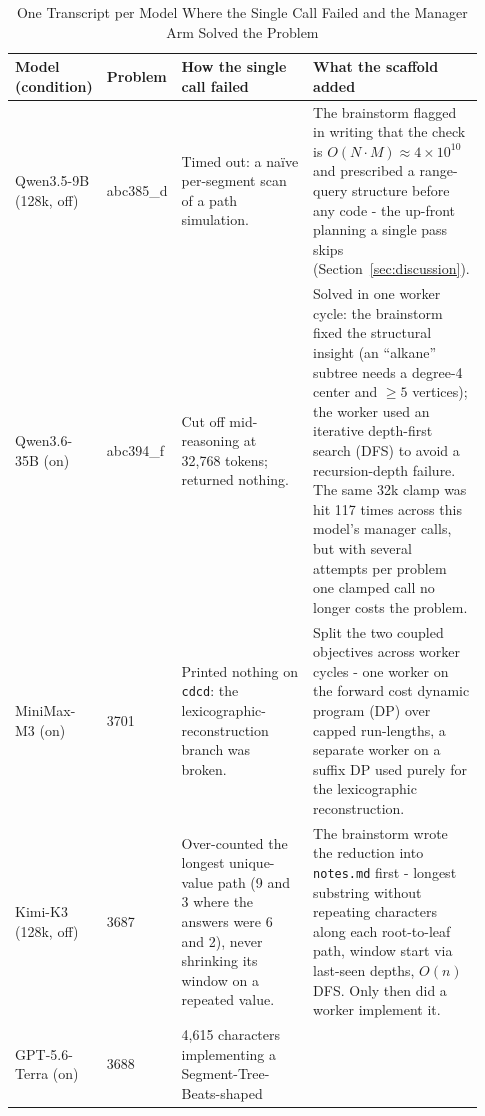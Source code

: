 \documentclass[journal]{IEEEtran}
\begin{document}
\begin{table}[!t]
\centering
\caption{One Transcript per Model Where the Single Call Failed and the Manager Arm Solved the Problem}
\label{tab:transcripts}
\footnotesize
\setlength{\tabcolsep}{4pt}
\setlength{\defaultaddspace}{2.5pt}
\begin{tabular}{@{}p{0.155\linewidth}p{0.101\linewidth}p{0.310\linewidth}p{0.364\linewidth}@{}}
\toprule
\textbf{Model} \newline \textbf{(condition)} & \textbf{Problem} & \textbf{How the single call failed} &
\textbf{What the scaffold added} \\
\midrule
Qwen3.5-9B \newline (128k, off) & abc385\_d & Timed out: a na\"ive per-segment scan of a path
simulation. & The brainstorm flagged in writing that the check is $O(N\cdot M) \approx
4\times10^{10}$ and prescribed a range-query structure before any code - the up-front
planning a single pass skips (Section~\ref{sec:discussion}). \\
\addlinespace
Qwen3.6-35B \newline (on) & abc394\_f & Cut off mid-reasoning at 32,768 tokens; returned nothing. &
Solved in one worker cycle: the brainstorm fixed the structural insight (an ``alkane'' subtree needs
a degree-4 center and $\ge 5$ vertices); the worker used an iterative depth-first search (DFS) to avoid a recursion-depth
failure. The same 32k clamp was hit 117 times across this model's manager calls, but with several
attempts per problem one clamped call no longer costs the problem. \\
\addlinespace
MiniMax-M3 \newline (on) & 3701 & Printed nothing on \texttt{cdcd}: the lexicographic-reconstruction
branch was broken. & Split the two coupled objectives across worker cycles - one worker on the
forward cost dynamic program (DP) over capped run-lengths, a separate worker on a suffix DP used purely for the
lexicographic reconstruction. \\
\addlinespace
Kimi-K3 \newline (128k, off) & 3687 & Over-counted the longest unique-value path (9 and 3 where the
answers were 6 and 2), never shrinking its window on a repeated value. & The brainstorm wrote the
reduction into \texttt{notes.md} first - longest substring without repeating characters along each
root-to-leaf path, window start via last-seen depths, $O(n)$ DFS. Only then did a worker
implement it. \\
\addlinespace
GPT-5.6-Terra \newline (on) & 3688 & 4,615 characters implementing a Segment-Tree-Beats-shaped

\end{tabular}
\end{table}
\end{document}
